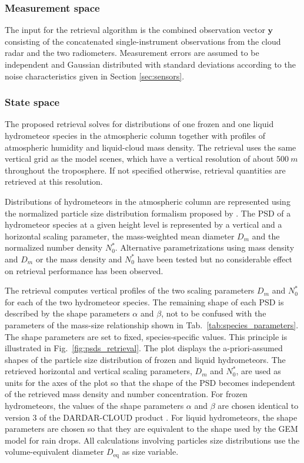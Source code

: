 \documentclass[journal abbreviation, manuscript]{copernicus}
\begin{document}
\subsubsection{Measurement space}
\label{sec:orge7dc286}

The input for the retrieval algorithm is the combined observation vector
$\mathbf{y}$ consisting of the concatenated single-instrument observations from
the cloud radar and the two radiometers. Measurement errors are assumed to be
independent and Gaussian distributed with standard deviations according to the
noise characteristics given in Section \ref{sec:sensors}.

\subsubsection{State space}
\label{sec:method:fowardmodel}

The proposed retrieval solves for distributions of one frozen and one liquid
hydrometeor species in the atmospheric column together with profiles of
atmospheric humidity and liquid-cloud mass density. The retrieval uses the same
vertical grid as the model scenes, which have a vertical resolution of about
$500\ \unit{m}$ throughout the troposphere. If not specified otherwise,
retrieval quantities are retrieved at this resolution.

Distributions of hydrometeors in the atmospheric column are represented using
the normalized particle size distribution formalism proposed by
\cite{delanoe05}. The PSD of a hydrometeor species at a given height level is
represented by a vertical and a horizontal scaling parameter, the mass-weighted
mean diameter $D_m$ and the normalized number density $N_0^*$. Alternative 
parametrizations using mass density and $D_m$ or the mass density and $N_0^*$
have been tested but no considerable effect on retrieval performance has been
observed.

The retrieval computes vertical profiles of the two scaling parameters $D_m$ and
$N_0^*$ for each of the two hydrometeor species. The remaining shape of each PSD
is described by the shape parameters $\alpha$ and $\beta$, not to
be confused with the parameters of the mass-size relationship shown in
Tab.~\ref{tab:species_parameters}. The shape parameters are set to fixed, species-specific
values. This principle is illustrated in Fig.~\ref{fig:psds_retrieval}.
The plot displays the a-priori-assumed shapes of the particle size distribution
of frozen and liquid hydrometeors. The retrieved horizontal and vertical scaling
parameters, $D_m$ and $N_0^*$, are used as units for the axes of the plot so
that the shape of the PSD becomes independent of the retrieved mass density and
number concentration. For frozen hydrometeors, the values of the shape
parameters $\alpha$ and $\beta$ are chosen identical to version 3 of the
DARDAR-CLOUD product \citep{cazenave18}. For liquid hydrometeors, the shape
parameters are chosen so that they are equivalent to the shape used by the GEM
model for rain drops. All calculations involving particles size distributions
use the volume-equivalent diameter $D_\text{eq}$ as size variable.
\end{document}
